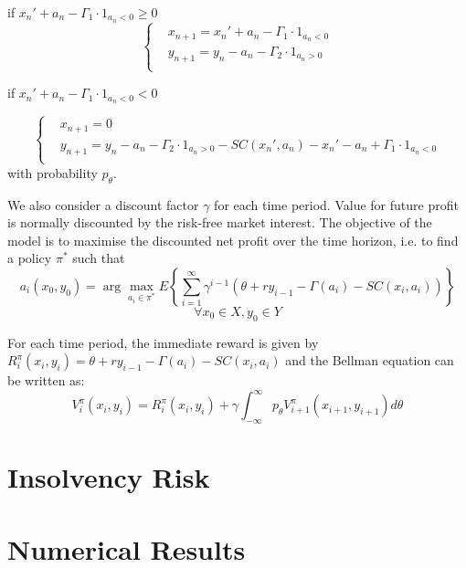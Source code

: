 \documentclass[12pt]{article}
\begin{document}
if $x_n' + a_n - \Gamma_1 \cdot 1_{a_n < 0} \geq 0$
$$ \left\{ 
\begin{aligned}
& x_{n+1} = x_n' + a_n - \Gamma_1\cdot 1_{a_n < 0}\\
&y_{n+1} = y_n - a_n - \Gamma_2 \cdot 1_{a_n > 0}\\
\end{aligned}
\right.$$ 

 if $x_n' + a_n - \Gamma_1 \cdot 1_{a_n < 0} < 0$

$$ \left\{ 
\begin{aligned}
& x_{n+1} = 0\\
&y_{n+1} = y_n - a_n - \Gamma_2 \cdot 1_{a_n > 0} - SC(x_n', a_n) - x_n' - a_n + \Gamma_1\cdot 1_{a_n < 0} \\
\end{aligned}
\right.$$ with probability $p_\theta$.


We also consider a discount factor $\gamma$ for each time period. Value for future profit is normally discounted by the risk-free market interest. 
The objective of the model is to maximise the discounted net profit over the time horizon, i.e. to find a policy $\pi^*$ such that
$$a_i(x_0, y_0) = \arg\max_{a_i \in \pi^*} E\left\{ \sum_{i=1}^\infty \gamma^{i-1} \left(\theta + ry_{i-1} - \Gamma(a_i) - SC(x_i, a_i)  \right)\right\}$$
$$\forall x_0 \in X, y_0 \in Y$$

 For each time period, the immediate reward is given by $R_i^\pi (x_i, y_i)=  \theta + ry_{i-1} - \Gamma(a_i) - SC(x_i, a_i)$ and the Bellman equation can be written as: $$V_i^\pi(x_i, y_i) = R_i^\pi(x_i, y_i) + \gamma \int^\infty_{-\infty}p_\theta V_{i+1}^\pi(x_{i+1},y_{i+1})d \theta$$











\section{Insolvency Risk}
\section{Numerical Results}
\newpage


\end{document}
